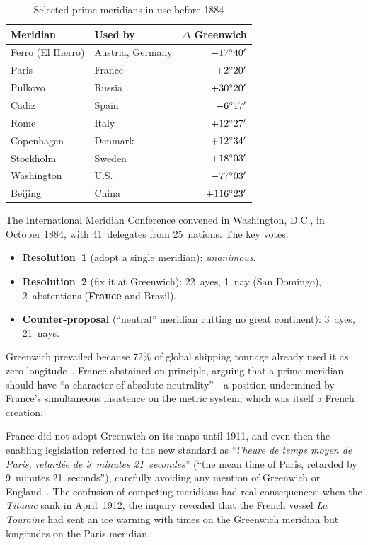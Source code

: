\documentclass[10pt,a4paper]{article}
\begin{document}
\begin{table}[H]
\centering
\caption{Selected prime meridians in use before 1884}
\label{tab:meridians}
\small
\begin{tabular}{@{}llr@{}}
\toprule
\textbf{Meridian} & \textbf{Used by} & \textbf{$\Delta$ Greenwich} \\
\midrule
Ferro (El Hierro)  & Austria, Germany & $-17\degree 40'$ \\
Paris              & France           & $+2\degree 20'$ \\
Pulkovo            & Russia           & $+30\degree 20'$ \\
Cadiz              & Spain            & $-6\degree 17'$ \\
Rome               & Italy            & $+12\degree 27'$ \\
Copenhagen         & Denmark          & $+12\degree 34'$ \\
Stockholm          & Sweden           & $+18\degree 03'$ \\
Washington         & U.S.             & $-77\degree 03'$ \\
Beijing            & China            & $+116\degree 23'$ \\
\bottomrule
\end{tabular}
\end{table}

The International Meridian Conference convened in Washington, D.C., in October
1884, with 41~delegates from 25~nations. The key votes:

\begin{itemize}[nosep]
  \item \textbf{Resolution~1} (adopt a single meridian): \emph{unanimous}.
  \item \textbf{Resolution~2} (fix it at Greenwich): 22~ayes, 1~nay
    (San Domingo), 2~abstentions (\textbf{France} and Brazil).
  \item \textbf{Counter-proposal} (``neutral'' meridian cutting no great
    continent): 3~ayes, 21~nays.
\end{itemize}

\noindent
Greenwich prevailed because 72\% of global shipping tonnage already used it
as zero longitude~\cite{howse1997}. France abstained on principle, arguing that a prime
meridian should have ``a character of absolute neutrality''---a position
undermined by France's simultaneous insistence on the metric system, which
was itself a French creation.

France did not adopt Greenwich on its maps until 1911, and even then the
enabling legislation referred to the new standard as ``\textit{l'heure de
temps moyen de Paris, retard\'{e}e de 9~minutes 21~secondes}'' (``the mean
time of Paris, retarded by 9~minutes 21~seconds''), carefully avoiding any
mention of Greenwich or England~\cite{howse1997}. The confusion of competing
meridians had real consequences: when the \textit{Titanic} sank in April~1912,
the inquiry revealed that the French vessel \textit{La Touraine} had sent an
ice warning with times on the Greenwich meridian but longitudes on the Paris
meridian.
\end{document}
